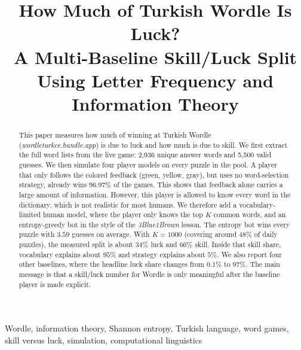 \documentclass[conference]{IEEEtran}
\begin{document}
\title{How Much of Turkish Wordle Is Luck? \\
A Multi-Baseline Skill/Luck Split Using Letter Frequency
and Information Theory}

\author{
}

\maketitle

\begin{abstract}
This paper measures how much of winning at Turkish Wordle
(\textit{wordleturkce.bundle.app}) is due to luck and how much is due to
skill. We first extract the full word lists from the live game: 2{,}936
unique answer words and 5{,}500 valid guesses. We then simulate four
player models on every puzzle in the pool. A player that only follows
the colored feedback (green, yellow, gray), but uses no word-selection
strategy, already wins $96.97\%$ of the games. This shows that feedback
alone carries a large amount of information. However, this player is
allowed to know every word in the dictionary, which is not realistic for
most humans. We therefore add a vocabulary-limited human model, where
the player only knows the top $K$ common words, and an entropy-greedy
bot in the style of the \textit{3Blue1Brown} lesson. The entropy bot wins
every puzzle with $3.59$ guesses on average. With $K{=}1000$ (covering
around $48\%$ of daily puzzles), the measured split is about $34\%$ luck
and $66\%$ skill. Inside that skill share, vocabulary explains about
$95\%$ and strategy explains about $5\%$. We also report four other
baselines, where the headline luck share changes from $0.1\%$ to $97\%$.
The main message is that a skill/luck number for Wordle is only
meaningful after the baseline player is made explicit.
\end{abstract}

\begin{IEEEkeywords}
Wordle, information theory, Shannon entropy, Turkish language, word games,
skill versus luck, simulation, computational linguistics
\end{IEEEkeywords}
\end{document}
